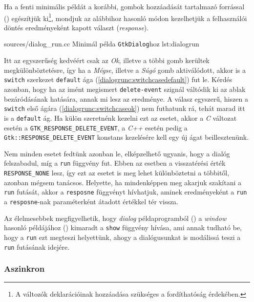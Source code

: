 Ha a fenti minimális példát a korábbi, gombok hozzáadását tartalmazó forrással () egészítjük ki\footnote{A változók deklarációinak hozzáadása szükséges a fordíthatóság érdekében.}, mondjuk az alábbihoz hasonló módon kezelhetjük a felhasználói döntés eredményeként kapott választ (\textit{response}).

{sources/dialog_run.cc}
{Minimál példa \texttt{GtkDialog}hoz}
{lst:dialogrun}

Itt az egyszerűség kedvéért csak az \textit{Ok}, illetve a többi gomb kerültek megkülönböztetésre, így ha a \textit{Mégse}, illetve a \textit{Súgó} gomb aktiválódott, akkor is a \texttt{switch} szerkezet \texttt{default} ága (\ref{dialogrunc:switchcasedefault}) fut le. Kérdés azonban, hogy ha az imént megismert \texttt{delete-event} szignál váltódik ki az ablak bezáródásának hatására, annak mi lesz az eredménye. A válasz egyszerű, hiszen a \texttt{switch} első ágára (\ref{dialogrunc:switchcaseok}) nem futhatunk rá, tehát marad itt is a \texttt{default} ág. Ha külön szeretnénk kezelni ezt az esetet, akkor a \textit{C} változat esetén a \texttt{GTK\_RESPONSE\_DELETE\_EVENT}, a \textit{C++} esetén pedig a \texttt{Gtk::RESPONSE\_DELETE\_EVENT} konstans kezelésére kell egy új ágat beillesztenünk.

Nem minden esetet fedtünk azonban le, elképzelhető ugyanis, hogy a dialóg felszabadul, míg a \texttt{run} függvény fut. Ebben az esetben a visszatérési érték \texttt{RESPONSE\_NONE} lesz, így ezt az esetet is meg lehet különböztetni a többitől, azonban mégsem tanácsos. Helyette, ha mindenképpen meg akarjuk szakítani a \texttt{run} futását, akkor a \texttt{resposne} függvényt hívhatjuk, aminek eredményeként a \texttt{run} a \texttt{resposne}-nak paraméterként átadott értékkel tér vissza.

Az élelmesebbek megfigyelhetik, hogy \textit{dialog} példaprogramból () a \textit{window} hasonló példájához () kimaradt a \texttt{show} függvény hívása, ami annak tudható be, hogy a \texttt{run} ezt megteszi helyettünk, ahogy a dialógusunkat is modálissá teszi a \texttt{run} futásának idejére.

\subsubsection{Aszinkron}

